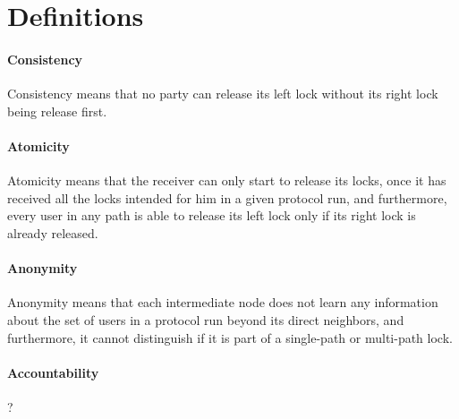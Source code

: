 \section*{Definitions}

\paragraph{Consistency} Consistency means that no party can release its left lock without its 
right lock being release first.

\paragraph{Atomicity} Atomicity means that the receiver can only start to release its locks, once it 
has received all the locks intended for him in a given protocol run, and furthermore, every user in 
any path is able to release its left lock only if its right lock is already released. 

\paragraph{Anonymity} Anonymity means that each intermediate node does not learn any information about 
the set of users in a protocol run beyond its direct neighbors, and furthermore, it cannot distinguish 
if it is part of a single-path or multi-path lock.

\paragraph{Accountability} ?
